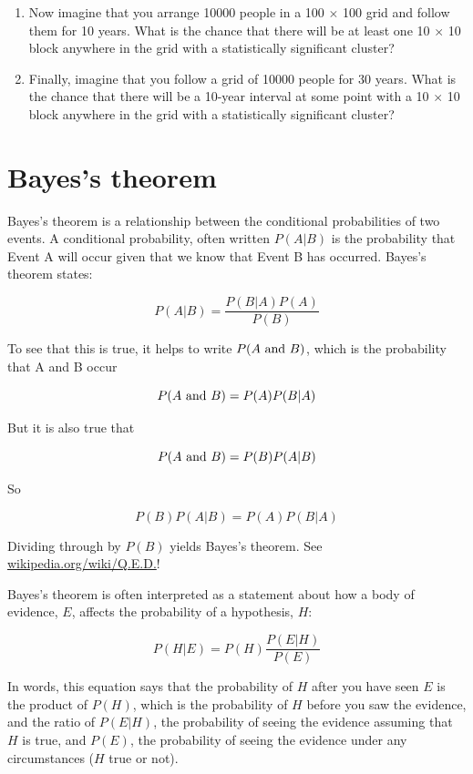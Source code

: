 \documentclass[12pt]{book}
\begin{document}
\begin{ex}
\begin{enumerate}
\item Now imagine that you arrange 10000 people in a 100 $\times$ 100
  grid and follow them for 10 years.  What is the chance that there
  will be at least one 10 $\times$ 10 block anywhere in the grid
  with a statistically significant cluster?

\item Finally, imagine that you follow a grid of 10000 people for 30
  years.  What is the chance that there will be a 10-year interval
  at some point with a 10 $\times$ 10 block anywhere in the grid
  with a statistically significant cluster?

\end{enumerate}

\end{ex}



\section{Bayes's theorem}

Bayes's theorem is a relationship between the conditional probabilities
of two events.  A conditional probability, often written $P(A|B)$ is
the probability that Event A will occur given that we know that
Event B has occurred.  Bayes's theorem states:

\[ P(A|B) = \frac{P(B|A)P(A)}{P(B)} \]

To see that this is true, it helps to write $P(A ~\mbox{and}~ B)$, which
is the probability that A and B occur

\[ P(A ~\mbox{and}~ B) = P(A) P(B|A) \]

But it is also true that 
 
\[ P(A ~\mbox{and}~ B) = P(B) P(A|B) \]

So

\[ P(B) P(A|B) = P(A) P(B|A) \]

Dividing through by $P(B)$ yields Bayes's theorem.
See \url{wikipedia.org/wiki/Q.E.D.}!

Bayes's theorem is often interpreted as a statement about 
how a body of evidence, $E$, affects the probability of a 
hypothesis, $H$:

\[ P(H|E) = P(H) \frac{P(E|H)}{P(E)} \]

In words, this equation says that the probability of $H$ after you
have seen $E$ is the product of $P(H)$, which is the probability of
$H$ before you saw the evidence, and the ratio of $P(E|H)$, the
probability of seeing the evidence assuming that $H$ is true, and
$P(E)$, the probability of seeing the evidence under any circumstances
($H$ true or not).
\end{document}
